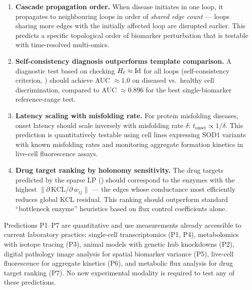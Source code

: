 \begin{enumerate}[label=\textbf{P\arabic*.}, itemsep=6pt, leftmargin=*]
  \item \textbf{Cascade propagation order.}
        When disease initiates in one loop, it propagates to neighbouring
        loops in order of \emph{shared edge count} --- loops sharing more
        edges with the initially affected loop are disrupted earlier.
        This predicts a specific topological order of biomarker
        perturbation that is testable with time-resolved multi-omics.

  \item \textbf{Self-consistency diagnosis outperforms template comparison.}
        A diagnostic test based on checking $H_\ell \approx \mathrm{Id}$
        for all loops (self-consistency criterion, )
        should achieve AUC $\approx 1.0$ on diseased vs.\ healthy cell
        discrimination, compared to AUC $\approx 0.896$ for the best
        single-biomarker reference-range test.

  \item \textbf{Latency scaling with misfolding rate.}
        For protein misfolding diseases, onset latency should scale
        inversely with misfolding rate $\delta$:
        $t_{\mathrm{onset}} \propto 1/\delta$.  This prediction is
        quantitatively testable using cell lines expressing SOD1 variants
        with known misfolding rates and monitoring aggregate formation
        kinetics in live-cell fluorescence assays.

  \item \textbf{Drug target ranking by holonomy sensitivity.}
        The drug targets predicted by the sparse LP ()
        should correspond to the enzymes with the highest
        $\|\partial\,\mathrm{KCL}/\partial\,w_{ij}\|$ --- the edges whose
        conductance most efficiently reduces global KCL residual.  This
        ranking should outperform standard ``bottleneck enzyme'' heuristics
        based on flux control coefficients alone.

\end{enumerate}

\begin{remark}[Testability]
Predictions P1--P7 are quantitative and use measurements already accessible
to current laboratory practice: single-cell transcriptomics (P1, P4),
metabolomics with isotope tracing (P3), animal models with genetic hub
knockdowns (P2), digital pathology image analysis for spatial biomarker
variance (P5), live-cell fluorescence for aggregate kinetics (P6), and
metabolic flux analysis for drug target ranking (P7).  No new experimental
modality is required to test any of these predictions.
\end{remark}
